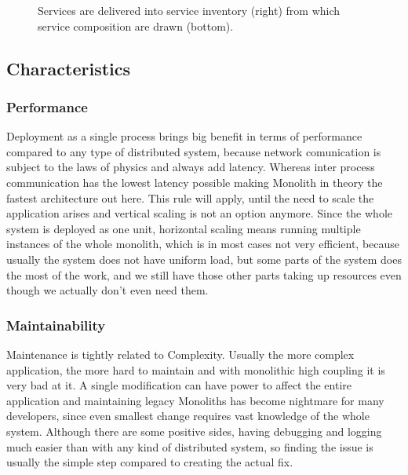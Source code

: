 \begin{figure}
    \centering
    
    \caption{Services are delivered into service inventory (right) from which service composition are drawn (bottom). \label{img:soa_architecture}}
\end{figure}



\subsection{Characteristics}

\subsubsection{Performance}
\label{section:monolith:performance}
Deployment as a single process brings big benefit in terms of performance compared to any type of distributed system, because network comunication is subject to the laws of physics and always add latency. Whereas inter process communication has the lowest latency possible making Monolith in theory the fastest architecture out here. This rule will apply, until the need to scale the application arises and vertical scaling is not an option anymore. Since the whole system is deployed as one unit, horizontal scaling means running multiple instances of the whole monolith, which is in most cases not very efficient, because usually the system does not have uniform load, but some parts of the system does the most of the work, and we still have those other parts taking up resources even though we actually don't even need them.


% 

\subsubsection{Maintainability}
Maintenance is tightly related to Complexity. Usually the more complex application, the more hard to maintain and with monolithic high coupling it is very bad at it. A single modification can have power to affect the entire application and maintaining legacy Monoliths has become nightmare for many developers, since even smallest change requires vast knowledge of the whole system. Although there are some positive sides, having debugging and logging much easier than with any kind of distributed system, so finding the issue is usually the simple step compared to creating the actual fix.

